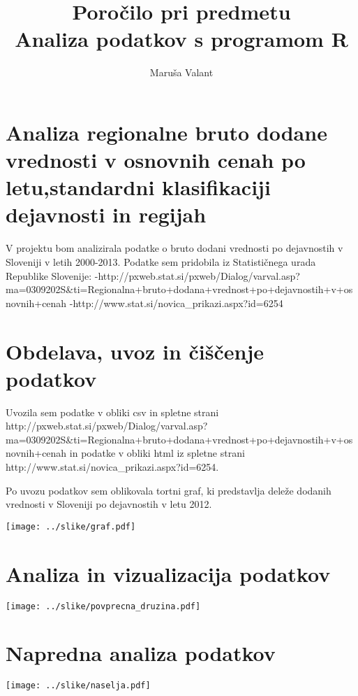 \documentclass[11pt,a4paper]{article}
\begin{document}
\title{Poročilo pri predmetu \\
Analiza podatkov s programom R}
\author{Maruša Valant}
\maketitle

\section{Analiza regionalne bruto dodane vrednosti v osnovnih cenah po letu,standardni klasifikaciji dejavnosti in regijah} 

V projektu bom analizirala podatke o bruto dodani vrednosti po dejavnostih v Sloveniji v letih 2000-2013. Podatke sem pridobila iz Statističnega urada Republike Slovenije:
-http://pxweb.stat.si/pxweb/Dialog/varval.asp?ma=0309202S&ti=Regionalna+bruto+dodana+vrednost+po+dejavnostih+v+osnovnih+cenah%
-http://www.stat.si/novica_prikazi.aspx?id=6254

\section{Obdelava, uvoz in čiščenje podatkov}

Uvozila sem podatke v obliki csv in spletne strani http://pxweb.stat.si/pxweb/Dialog/varval.asp?ma=0309202S&ti=Regionalna+bruto+dodana+vrednost+po+dejavnostih+v+osnovnih+cenah%
in podatke v obliki html iz spletne strani http://www.stat.si/novica_prikazi.aspx?id=6254.

Po uvozu podatkov sem oblikovala tortni graf, ki predstavlja deleže dodanih vrednosti v Sloveniji po dejavnostih v letu 2012.

\texttt{[image: ../slike/graf.pdf]}



\section{Analiza in vizualizacija podatkov}

\texttt{[image: ../slike/povprecna\_druzina.pdf]}

\section{Napredna analiza podatkov}

\texttt{[image: ../slike/naselja.pdf]}
\end{document}
